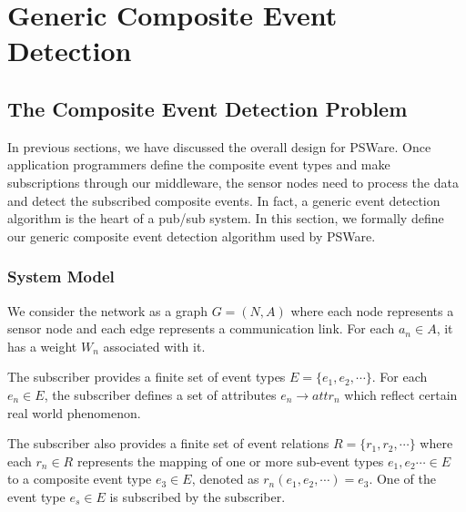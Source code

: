 \chapter{Generic Composite Event Detection}
\label{chapter:ted}
\section{The Composite Event Detection Problem}
\label{sec:system_model}
In previous sections, we have discussed the overall design for PSWare. Once application programmers define the composite event types and make subscriptions through our middleware, the sensor nodes need to process the data and detect the subscribed composite events. In fact, a generic event detection algorithm is the heart of a pub/sub system. In this section, we formally define our generic composite event detection algorithm used by PSWare.

\subsection{System Model}
We consider the network as a graph \(G=(N, A)\) where each node represents a sensor node and each edge represents a communication link. For each \(a_n\in A\), it has a weight \(W_n\) associated with it.

The subscriber provides a finite set of event types \(E=\{e_1,e_2,\cdots\}\). For each \(e_n\in E\), the subscriber defines a set of attributes \(e_n\rightarrow attr_n\) which reflect certain real world phenomenon. 

The subscriber also provides a finite set of event relations \(R=\{r_1,r_2, \cdots\}\) where each \(r_n\in R\) represents the mapping of one or more sub-event types \(e_1, e_2\cdots \in E\) to a composite event type \(e_3\in E\), denoted as \(r_n(e_1, e_2, \cdots)=e_3\). One of the event type \(e_s\in E\) is subscribed by the subscriber. %

\begin{comment}
\begin{figure}
\centering
\figurecurrentwidth{eventdag}
\caption{Event DAG}
\label{fig:eventdag}
\end{figure}
\end{comment}

